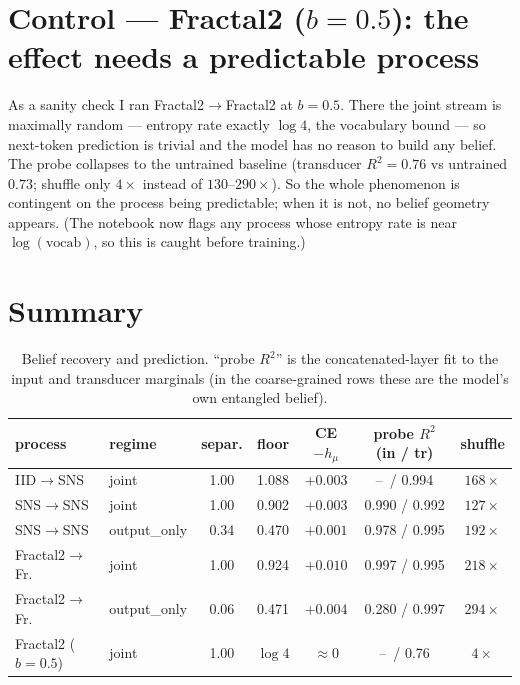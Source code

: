 \documentclass[11pt]{article}
\begin{document}
\section{Control --- Fractal2 ($b{=}0.5$): the effect needs a predictable process}

As a sanity check I ran Fractal2$\to$Fractal2 at $b{=}0.5$. There the joint stream is maximally
random --- entropy rate exactly $\log 4$, the vocabulary bound --- so next-token prediction is
trivial and the model has no reason to build any belief. The probe collapses to the untrained
baseline (transducer $R^2=0.76$ vs untrained $0.73$; shuffle only $4\times$ instead of
$130$--$290\times$). So the whole phenomenon is contingent on the process being predictable; when it
is not, no belief geometry appears. (The notebook now flags any process whose entropy rate is near
$\log(\text{vocab})$, so this is caught before training.)

\section{Summary}

\begin{table}[H]\centering\small
\begin{tabular}{llccccc}
\toprule
process & regime & separ. & floor & CE$-h_\mu$ & probe $R^2$ (in / tr) & shuffle \\
\midrule
IID$\to$SNS          & joint        & 1.00 & 1.088 & $+0.003$ & --\ / 0.994 & $168\times$ \\
SNS$\to$SNS          & joint        & 1.00 & 0.902 & $+0.003$ & 0.990 / 0.992 & $127\times$ \\
SNS$\to$SNS          & output\_only & 0.34 & 0.470 & $+0.001$ & 0.978 / 0.995 & $192\times$ \\
Fractal2$\to$Fr.\    & joint        & 1.00 & 0.924 & $+0.010$ & 0.997 / 0.995 & $218\times$ \\
Fractal2$\to$Fr.\    & output\_only & 0.06 & 0.471 & $+0.004$ & 0.280 / 0.997 & $294\times$ \\
Fractal2 ($b{=}0.5$) & joint        & 1.00 & $\log 4$ & $\approx 0$ & --\ / 0.76 & $4\times$ \\
\bottomrule
\end{tabular}
\caption{Belief recovery and prediction. ``probe $R^2$'' is the concatenated-layer fit to the input
and transducer marginals (in the coarse-grained rows these are the model's own entangled belief).}
\end{table}
\end{document}
